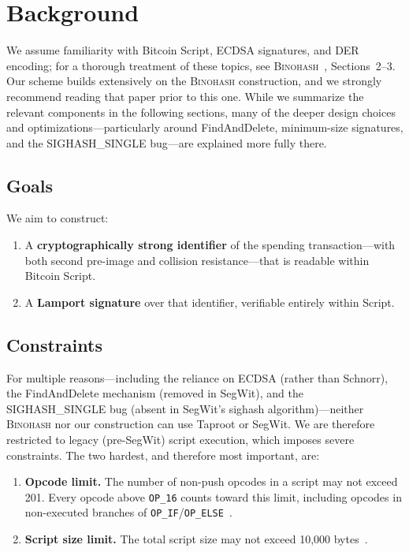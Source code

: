 \documentclass[11pt, a4paper]{article}
\begin{document}
\section{Background}
\label{sec:background}

We assume familiarity with Bitcoin Script, ECDSA signatures, and DER encoding; for a thorough treatment of these topics, see \textsc{Binohash}~\cite{linus2024binohash}, Sections~2--3. Our scheme builds extensively on the \textsc{Binohash} construction, and we strongly recommend reading that paper prior to this one. While we summarize the relevant components in the following sections, many of the deeper design choices and optimizations---particularly around FindAndDelete, minimum-size signatures, and the SIGHASH\_SINGLE bug---are explained more fully there.

\subsection{Goals}
\label{sec:goals}

We aim to construct:
\begin{enumerate}
    \item A \textbf{cryptographically strong identifier} of the spending transaction---with both second pre-image and collision resistance---that is readable within Bitcoin Script.
    \item A \textbf{Lamport signature} over that identifier, verifiable entirely within Script.
\end{enumerate}

\subsection{Constraints}
\label{sec:constraints}

For multiple reasons---including the reliance on ECDSA (rather than Schnorr), the FindAndDelete mechanism (removed in SegWit), and the SIGHASH\_SINGLE bug (absent in SegWit's sighash algorithm)---neither \textsc{Binohash} nor our construction can use Taproot or SegWit. We are therefore restricted to legacy (pre-SegWit) script execution, which imposes severe constraints. The two hardest, and therefore most important, are:

\begin{enumerate}
    \item \textbf{Opcode limit.} The number of non-push opcodes in a script may not exceed 201. Every opcode above \texttt{OP\_16} counts toward this limit, including opcodes in non-executed branches of \texttt{OP\_IF}/\texttt{OP\_ELSE}~\cite[Section~6]{linus2024binohash}.
    \item \textbf{Script size limit.} The total script size may not exceed 10,000 bytes~\cite[Section~6]{linus2024binohash}.
\end{enumerate}
\end{document}
